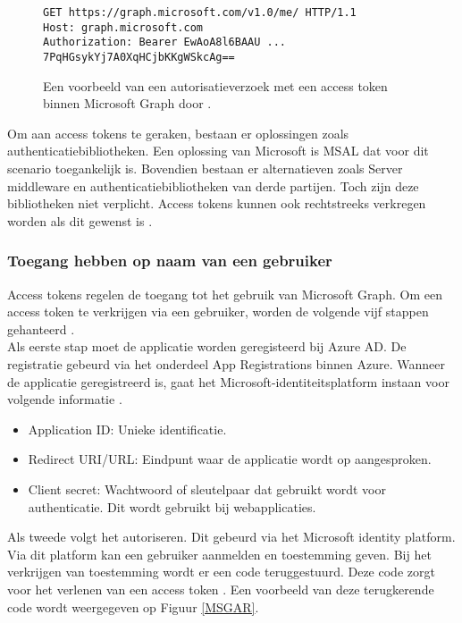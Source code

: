 \begin{figure}[h]
    \scriptsize
    \begin{verbatim}
GET https://graph.microsoft.com/v1.0/me/ HTTP/1.1
Host: graph.microsoft.com
Authorization: Bearer EwAoA8l6BAAU ... 7PqHGsykYj7A0XqHCjbKKgWSkcAg==
    \end{verbatim}    
    \caption[Voorbeeld Microsoft Graph Autorisatieverzoek]{Een voorbeeld van een autorisatieverzoek met een access token binnen Microsoft Graph door \textcite{Microsoft2022b}.}
    \label{MSGA}
\end{figure}

Om aan access tokens te geraken, bestaan er oplossingen zoals authenticatiebibliotheken. Een oplossing van Microsoft is \ac{MSAL} dat voor dit scenario toegankelijk is. Bovendien bestaan er alternatieven zoals Server middleware en authenticatiebibliotheken van derde partijen. Toch zijn deze bibliotheken niet verplicht. Access tokens kunnen ook rechtstreeks verkregen worden als dit gewenst is \autocite{Microsoft2022b}. 

\subsubsection{Toegang hebben op naam van een gebruiker}

Access tokens regelen de toegang tot het gebruik van Microsoft Graph. Om een access token te verkrijgen via een gebruiker, worden de volgende vijf stappen gehanteerd \autocite{Microsoft2023r}. \\

Als eerste stap moet de applicatie worden geregisteerd bij Azure \ac{AD}. De registratie gebeurd via het onderdeel App Registrations binnen Azure. Wanneer de applicatie geregistreerd is, gaat het Microsoft-identiteitsplatform instaan voor volgende informatie \autocite{Microsoft2023r}. 

\begin{itemize}
    \item Application ID: Unieke identificatie.
    \item Redirect URI/URL: Eindpunt waar de applicatie wordt op aangesproken.
    \item Client secret: Wachtwoord of sleutelpaar dat gebruikt wordt voor authenticatie. Dit wordt gebruikt bij webapplicaties.
\end{itemize}

Als tweede volgt het autoriseren. Dit gebeurd via het Microsoft identity platform. Via dit platform kan een gebruiker aanmelden en toestemming geven. Bij het verkrijgen van toestemming wordt er een code teruggestuurd. Deze code zorgt voor het verlenen van een access token \autocite{Microsoft2023r}. Een voorbeeld van deze terugkerende code wordt weergegeven op Figuur \ref{MSGAR}. \\

